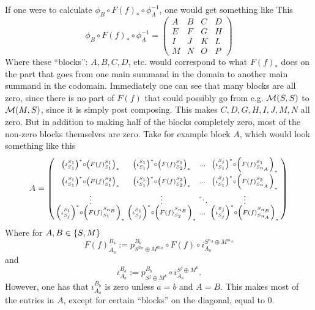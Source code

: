 \begin{remark}
    If one were to calculate \( \phi_B \circ F(f)_* \circ \phi_A^{-1} \), one would get something like This
    \[
        \phi_B \circ F(f)_* \circ \phi_A^{-1} =
        \begin{pmatrix}
            A & B & C & D \\
            E & F & G & H \\
            I & J & K & L \\
            M & N & O & P
        \end{pmatrix}
    \]
    Where these ``blocks'': \( A, B, C, D \), etc. would correspond to what \( F(f)_* \) does on the part that goes from one main summand in the domain to another main summand in the codomain. Immediately one can see that many blocks are all zero, since there is no part of \( F(f) \) that could possibly go from e.g. \( {\mathcal{M}}(S, S) \) to \( {\mathcal{M}}(M, S) \), since it is simply post composing. This makes \( C, D, G, H, I, J, M, N \) all zero. But in addition to making half of the blocks completely zero, most of the non-zero blocks themselves are zero. Take for example block \( A \), which would look something like this
    \[
        A =
        \begin{psmallmatrix}
            \left(  \iota_{S_1}^{S_1}  \right)^* \circ \left(  F(f)_{S_1}^{S_1}  \right)_* &
            \left(  \iota_{S_1}^{S_1}  \right)^* \circ \left(  F(f)_{S_2}^{S_1}  \right)_* &
            \dots &
            \left(  \iota_{S_1}^{S_j}  \right)^* \circ \left(  F(f)_{S_{n_A}}^{S_1}  \right)_* \\
            \left(  \iota_{S_1}^{S_1}  \right)^* \circ \left(  F(f)_{S_1}^{S_2}  \right)_* &
            \left(  \iota_{S_1}^{S_1}  \right)^* \circ \left(  F(f)_{S_2}^{S_2}  \right)_* &
            \dots &
            \left(  \iota_{S_1}^{S_j}  \right)^* \circ \left(  F(f)_{S_{n_A}}^{S_2}  \right)_* \\
            \vdots &
            \vdots &
            \ddots &
            \vdots \\
            \left(  \iota_{S_j}^{S_1}  \right)^* \circ \left(  F(f)_{S_1}^{S_{n_B}}  \right)_* &
            \left(  \iota_{S_j}^{S_1}  \right)^* \circ \left(  F(f)_{S_2}^{S_{n_B}}  \right)_* &
            \dots &
            \left(  \iota_{S_j}^{S_j}  \right)^* \circ \left(  F(f)_{S_{n_A}}^{S_{n_B}}  \right)_*
        \end{psmallmatrix}
    \]
    Where for \( A, B \in \left\{  S, M  \right\} \)
    \[
        F(f)_{A_a}^{B_b} := p_{S^{n_B} \oplus M^{m_B}}^{B_b} \circ F(f) \circ i_{A_a}^{S^{n_A} \oplus M^{m_A}}
    \]
    and
    \[
        \iota_{A_a}^{B_b} := p_{S^j \oplus M^k}^{B_b} \circ i_{A_a}^{S^j \oplus M^k}.
    \]
    However, one has that \( \iota_{A_a}^{B_b} \) is zero unless \( a = b \) and \( A = B \). This makes most of the entries in \( A \), except for certain ``blocks'' on the diagonal, equal to \( 0 \).


\end{remark}
